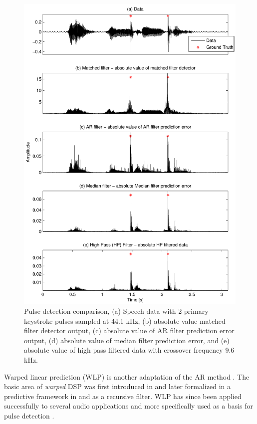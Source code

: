 \begin{figure}[!] %
\centering
\includegraphics[width=130mm]{LitRev_DetectCompare2.pdf}
\caption{Pulse detection comparison, (a) Speech data with 2 primary keystroke pulses sampled at 44.1 kHz, (b) absolute value matched filter detector output, (c) absolute value of AR filter prediction error output, (d) absolute value of median filter prediction error, and (e) absolute value of high pass filtered data with crossover frequency 9.6 kHz.}
\label{fig:LitRev_DetectCompare2}
\end{figure}

Warped linear prediction (WLP) is another adaptation of the AR method \cite{Esquef2002}. The basic area of \emph{warped} DSP was first introduced in \cite{Oppenheim1983} and later formalized in a predictive framework in \cite{Strube1980} and as a recursive filter\cite{Steiglitz1980}. WLP has since been applied successfully to several audio applications \cite{Karjalainen1997}\cite{Haermae2000} and more specifically used as a basis for pulse detection \cite{Esquef2000}\cite{Esquef2002}.

